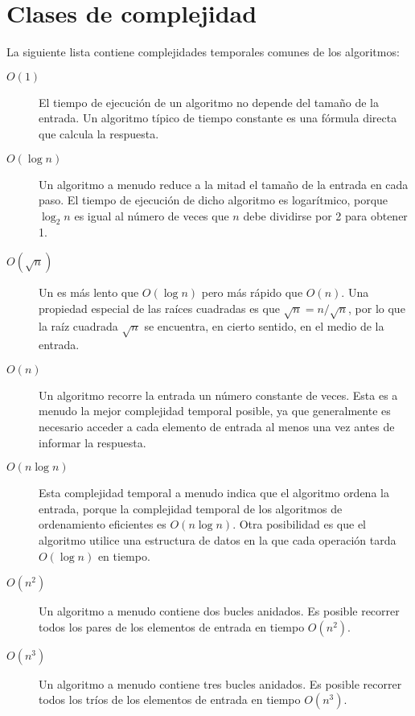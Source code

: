 \section{Clases de complejidad}


La siguiente lista contiene complejidades temporales comunes
de los algoritmos:

\begin{description}
\item[$O(1)$]
El tiempo de ejecución de un algoritmo 
no depende del tamaño de la entrada.
Un algoritmo típico de tiempo constante es una fórmula directa
que calcula la respuesta.

\item[$O(\log n)$]
Un algoritmo  a menudo reduce a la mitad
el tamaño de la entrada en cada paso.
El tiempo de ejecución de dicho algoritmo
es logarítmico, porque
$\log_2 n$ es igual al número de veces
que $n$ debe dividirse por 2 para obtener 1.

\item[$O(\sqrt n)$]
Un  es más lento que
$O(\log n)$ pero más rápido que $O(n)$.
Una propiedad especial de las raíces cuadradas es que
$\sqrt n = n/\sqrt n$, por lo que la raíz cuadrada $\sqrt n$ se encuentra,
en cierto sentido, en el medio de la entrada.

\item[$O(n)$]
Un algoritmo  recorre la entrada
un número constante de veces.
Esta es a menudo la mejor complejidad temporal posible,
ya que generalmente es necesario acceder a cada
elemento de entrada al menos una vez antes de
informar la respuesta.

\item[$O(n \log n)$]
Esta complejidad temporal a menudo indica que el
algoritmo ordena la entrada,
porque la complejidad temporal de los algoritmos de ordenamiento
eficientes es $O(n \log n)$.
Otra posibilidad es que el algoritmo
utilice una estructura de datos en la que cada operación
tarda $O(\log n)$ en tiempo.

\item[$O(n^2)$]
Un algoritmo  a menudo contiene
dos bucles anidados.
Es posible recorrer todos los pares de
los elementos de entrada en tiempo $O(n^2)$.

\item[$O(n^3)$]
Un algoritmo  a menudo contiene
tres bucles anidados.
Es posible recorrer todos los tríos de
los elementos de entrada en tiempo $O(n^3)$.


\end{description}
